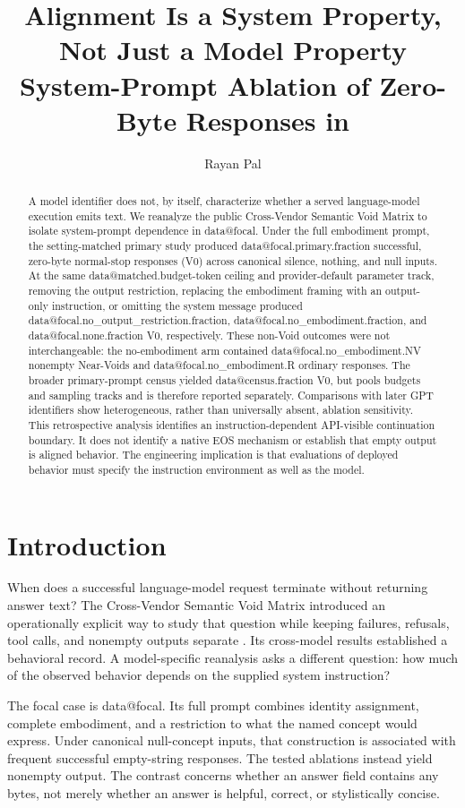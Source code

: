 \documentclass[11pt]{article}
\title{Alignment Is a System Property,\protect\\Not Just a Model Property\protect\\[0.4em]
\large System-Prompt Ablation of Zero-Byte Responses in \D{focal}}
\author{Rayan Pal}
\date{}
\makeatletter
\newcommand{\D}[1]{\csname data@#1\endcsname}
\makeatother
\begin{document}
\maketitle
\begin{abstract}
A model identifier does not, by itself, characterize whether a served language-model execution emits text. We reanalyze the public Cross-Vendor Semantic Void Matrix to isolate system-prompt dependence in \D{focal}. Under the full embodiment prompt, the setting-matched primary study produced \D{focal.primary.fraction} successful, zero-byte normal-stop responses (V0) across canonical silence, nothing, and null inputs. At the same \D{matched.budget}-token ceiling and provider-default parameter track, removing the output restriction, replacing the embodiment framing with an output-only instruction, or omitting the system message produced \D{focal.no_output_restriction.fraction}, \D{focal.no_embodiment.fraction}, and \D{focal.none.fraction} V0, respectively. These non-Void outcomes were not interchangeable: the no-embodiment arm contained \D{focal.no_embodiment.NV} nonempty Near-Voids and \D{focal.no_embodiment.R} ordinary responses. The broader primary-prompt census yielded \D{census.fraction} V0, but pools budgets and sampling tracks and is therefore reported separately. Comparisons with later GPT identifiers show heterogeneous, rather than universally absent, ablation sensitivity. This retrospective analysis identifies an instruction-dependent API-visible continuation boundary. It does not identify a native EOS mechanism or establish that empty output is aligned behavior. The engineering implication is that evaluations of deployed behavior must specify the instruction environment as well as the model.
\end{abstract}

\section{Introduction}
When does a successful language-model request terminate without returning answer text? The Cross-Vendor Semantic Void Matrix introduced an operationally explicit way to study that question while keeping failures, refusals, tool calls, and nonempty outputs separate \citep{pal_matrix}. Its cross-model results established a behavioral record. A model-specific reanalysis asks a different question: how much of the observed behavior depends on the supplied system instruction?

The focal case is \D{focal}. Its full prompt combines identity assignment, complete embodiment, and a restriction to what the named concept would express. Under canonical null-concept inputs, that construction is associated with frequent successful empty-string responses. The tested ablations instead yield nonempty output. The contrast concerns whether an answer field contains any bytes, not merely whether an answer is helpful, correct, or stylistically concise.
\end{document}
